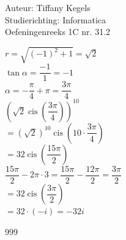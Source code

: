 \documentclass[a4paper]{article}
\begin{document}
  
\noindent \large Auteur: Tiffany Kegels \\
\noindent \large Studierichting: Informatica\\
\noindent \large Oefeningenreeks 1C nr. 31.2\\

\medskip

\normalsize

$r = \sqrt{(-1)^2 + 1} = \sqrt{2}$\\

$\tan \alpha = \dfrac{-1}{1} = -1$\\

$\alpha = -\dfrac{\pi}{4} + \pi = \dfrac{3\pi}{4}$\\

$\left(\sqrt{2} \operatorname{cis} \left(\dfrac{3\pi}{4}\right) \right) ^{10}$\\

$= (\sqrt{2})^{10} \operatorname{cis} \left( 10 \cdot \dfrac{3\pi}{4} \right) $\\

$= 32 \operatorname{cis} \left(\dfrac{15\pi}{2} \right)$\\

$\dfrac{15\pi}{2} - 2\pi \cdot 3 = \dfrac{15\pi}{2} - \dfrac{12\pi}{2} = \dfrac{3\pi}{2}$\\

$= 32 \operatorname{cis} \left(\dfrac{3\pi}{2} \right)$\\

$= 32 \cdot (-i) = -32i$\\

\begin{thebibliography}{999}

\end{thebibliography}
\end{document}
